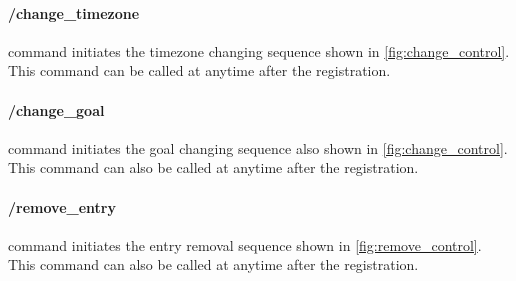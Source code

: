 \paragraph{/change\_timezone} command initiates the timezone changing sequence shown in \autoref{fig:change_control}. 
This command can be called at anytime after the registration. 

\paragraph{/change\_goal} command initiates the goal changing sequence also shown in \autoref{fig:change_control}. 
This command can also be called at anytime after the registration.

\paragraph{/remove\_entry} command initiates the entry removal sequence shown in \autoref{fig:remove_control}. 
This command can also be called at anytime after the registration.

